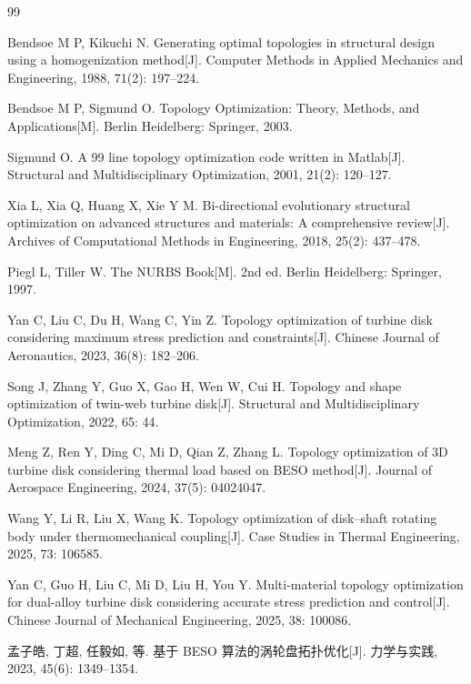 \documentclass{FRB-style}
\begin{document}
\clearpage
{}
{}
\begin{thebibliography}{99}

Bendsoe M P, Kikuchi N. Generating optimal topologies in structural design using a homogenization method[J]. Computer Methods in Applied Mechanics and Engineering, 1988, 71(2): 197--224.

Bendsoe M P, Sigmund O. Topology Optimization: Theory, Methods, and Applications[M]. Berlin Heidelberg: Springer, 2003.

Sigmund O. A 99 line topology optimization code written in Matlab[J]. Structural and Multidisciplinary Optimization, 2001, 21(2): 120--127.

Xia L, Xia Q, Huang X, Xie Y M. Bi-directional evolutionary structural optimization on advanced structures and materials: A comprehensive review[J]. Archives of Computational Methods in Engineering, 2018, 25(2): 437--478.

Piegl L, Tiller W. The NURBS Book[M]. 2nd ed. Berlin Heidelberg: Springer, 1997.

Yan C, Liu C, Du H, Wang C, Yin Z. Topology optimization of turbine disk considering maximum stress prediction and constraints[J]. Chinese Journal of Aeronautics, 2023, 36(8): 182--206.

Song J, Zhang Y, Guo X, Gao H, Wen W, Cui H. Topology and shape optimization of twin-web turbine disk[J]. Structural and Multidisciplinary Optimization, 2022, 65: 44.

Meng Z, Ren Y, Ding C, Mi D, Qian Z, Zhang L. Topology optimization of 3D turbine disk considering thermal load based on BESO method[J]. Journal of Aerospace Engineering, 2024, 37(5): 04024047.

Wang Y, Li R, Liu X, Wang K. Topology optimization of disk--shaft rotating body under thermomechanical coupling[J]. Case Studies in Thermal Engineering, 2025, 73: 106585.

Yan C, Guo H, Liu C, Mi D, Liu H, You Y. Multi-material topology optimization for dual-alloy turbine disk considering accurate stress prediction and control[J]. Chinese Journal of Mechanical Engineering, 2025, 38: 100086.

孟子皓, 丁超, 任毅如, 等. 基于 BESO 算法的涡轮盘拓扑优化[J]. 力学与实践, 2023, 45(6): 1349--1354.


\end{thebibliography}
\end{document}
